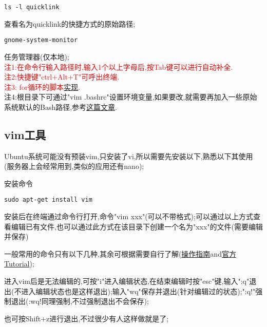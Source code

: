 \begin{lstlisting}[frame=single]
ls -l quicklink
\end{lstlisting}
\par
查看名为quicklink的快捷方式的原始路径;\par

\begin{lstlisting}[frame=single]
gnome-system-monitor
\end{lstlisting}
\par
任务管理器(仅本地);\\

\noindent
\textcolor{red}{注1:在命令行输入路径时,输入1个以上字母后,按Tab键可以进行自动补全.}\\
\textcolor{red}{注2:快捷键"ctrl+Alt+T"可呼出终端.}\\
\textcolor{red}{注3: for循环的脚本\href{https://www.linuxmi.com/linux-bash-shell-for-loop.html}{实现}.}\\
注4:根目录下可通过"vim .bashrc"设置环境变量,如果要改,就需要再加入一些原始系统默认的Bash路径,参考\href{https://blog.csdn.net/wxbug/article/details/123933624}{这篇文章}.


\subsection{vim工具}
\par
Ubuntu系统可能没有预装vim,只安装了vi,所以需要先安装以下,熟悉以下其使用(服务器上会经常用到,类似的应用还有nano);\par

安装命令
\begin{lstlisting}[frame=single]
	sudo apt-get install vim
\end{lstlisting}

安装后在终端通过命令行打开,命令"vim xxx"(可以不带格式);可以通过以上方式查看编辑已有文件,也可以通过此方式在该目录下创建一个名为"xxx"的文件(需要编辑并保存)\par

一般常用的命令只有以下几种,其余可根据需要自行了解(\href{https://zhuanlan.zhihu.com/p/149515175}{操作指南}and\href{https://vim.fandom.com/wiki/Tutorial}{官方Tutorial});\par

进入vim后是无法编辑的,可按"i"进入编辑状态,在结束编辑时按"esc"键,输入":q"退出(不进入编辑状态也是这样退出);输入"wq"保存并退出(针对编辑过的状态);":q!"强制退出(:wq!同理强制,不过强制退出不会保存);\par

也可按Shift+z进行退出,不过很少有人这样做就是了;\par

